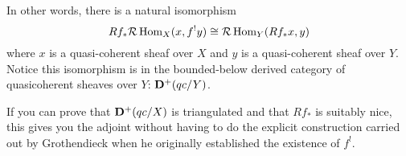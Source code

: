 \documentclass[12pt]{article}
\begin{document}
In other words, there is a natural isomorphism 
\[Rf_\ast \mathcal{R}\operatorname{Hom}_X(x,f^!y)\cong\mathcal{R}\operatorname{Hom}_Y(Rf_\ast x,y)\]
where $x$ is a quasi-coherent sheaf over $X$ and $y$ is a quasi-coherent sheaf over $Y$. Notice this isomorphism 
is in the bounded-below derived category of quasicoherent sheaves over $Y$: $\mathbf{D}^+(qc/Y)$.

If you can prove that $\mathbf{D}^+(qc/X)$ is triangulated and that $Rf_\ast$ is suitably nice, this gives you 
the adjoint without having to do the explicit construction carried out by Grothendieck when he originally 
established the existence of $f^!$.

\medskip

\printbibliography
\end{document}
